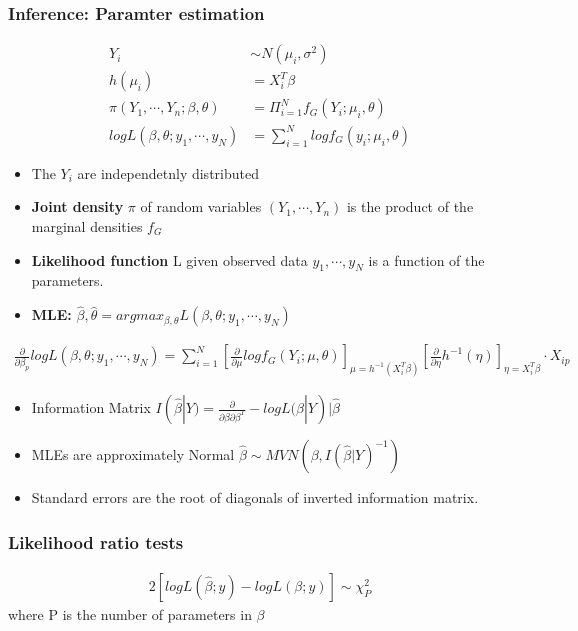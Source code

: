 \documentclass{article}
\theoremstyle{definition}
\theoremstyle{thrm}
\theoremstyle{lma}
\theoremstyle{ppst}
\theoremstyle{crlr}
\begin{document}
\subsubsection{Inference: Paramter estimation}
\begin{align*}
	Y_i &\sim N(\mu_i, \sigma^2)\\
	h(\mu_i) &= X_i^T\beta \\
	\pi(Y_1,\cdots,Y_n;\beta,\theta)&= \Pi^N_{i=1} f_G(Y_i;\mu_i,\theta)\\
	log L(\beta,\theta;y_1,\cdots,y_N) &= \sum_{i=1}^N log f_G(y_i;\mu_i,\theta)
\end{align*}
\begin{itemize}
	\item The $Y_i$ are independetnly distributed
	\item \textbf{Joint density} $\pi$ of random variables $(Y_1,\cdots,Y_n)$ is the product of the marginal densities $f_G$
	\item \textbf{Likelihood function} L given observed data $y_1,\cdots,y_N$ is a function of the parameters. 
	\item \textbf{MLE: } $\hat{\beta},\hat{\theta} = argmax_{\beta,\theta}L(\beta,\theta;y_1,\cdots,y_N)$
\end{itemize}
\begin{align*}
	\frac{\partial }{\partial \beta_p}log L(\beta,\theta;y_1,\cdots,y_N) = \sum_{i=1}^N[\frac{\partial }{\partial \mu} log f_G(Y_i;\mu,\theta)]_{\mu = h^{-1}(X_i^T\beta)}[\frac{\partial }{\partial \eta} h^{-1}(\eta)]_{\eta = X_i^T\beta}\cdot X_{ip}
\end{align*}
\begin{itemize}
	\item Information Matrix $I(\hat{\beta}|Y) = \frac{\partial}{\partial \beta\partial \beta^T}-log L(\beta|Y)|\hat{\beta}$
	\item MLEs are approximately Normal $\hat{\beta} \sim MVN(\beta,I(\hat{\beta}|Y)^{-1})$
	\item Standard errors are the root of diagonals of inverted information matrix.
\end{itemize}
\subsubsection{Likelihood ratio tests}
\begin{align*}
	2[logL(\hat{\beta};y)-log L(\beta;y)] \sim \chi_P^2
\end{align*}
where P is the number of parameters in $\beta$\\
\end{document}
